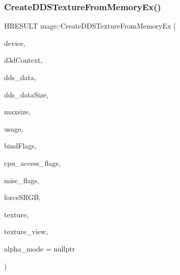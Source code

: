\subsubsection{\texorpdfstring{Create\+D\+D\+S\+Texture\+From\+Memory\+Ex()}{CreateDDSTextureFromMemoryEx()}\hspace{0.1cm}{\footnotesize\ttfamily [2/4]}}
{\footnotesize\ttfamily H\+R\+E\+S\+U\+LT mage\+::\+Create\+D\+D\+S\+Texture\+From\+Memory\+Ex (\begin{DoxyParamCaption}\item[{\+\_\+\+In\+\_\+ \hyperlink{namespacemage_ae74f374780900893caa5555d1031fd79}{Com\+Ptr}$<$ I\+D3\+D11\+Device2 $>$}]{device,  }\item[{\+\_\+\+In\+\_\+opt\+\_\+ I\+D3\+D11\+Device\+Context $\ast$}]{d3d\+Context,  }\item[{\+\_\+\+In\+\_\+reads\+\_\+bytes\+\_\+(dds\+\_\+data\+Size) const uint8\+\_\+t $\ast$}]{dds\+\_\+data,  }\item[{\+\_\+\+In\+\_\+ size\+\_\+t}]{dds\+\_\+data\+Size,  }\item[{\+\_\+\+In\+\_\+ size\+\_\+t}]{maxsize,  }\item[{\+\_\+\+In\+\_\+ D3\+D11\+\_\+\+U\+S\+A\+GE}]{usage,  }\item[{\+\_\+\+In\+\_\+ uint32\+\_\+t}]{bind\+Flags,  }\item[{\+\_\+\+In\+\_\+ uint32\+\_\+t}]{cpu\+\_\+access\+\_\+flags,  }\item[{\+\_\+\+In\+\_\+ uint32\+\_\+t}]{misc\+\_\+flags,  }\item[{\+\_\+\+In\+\_\+ bool}]{force\+S\+R\+GB,  }\item[{\+\_\+\+Outptr\+\_\+opt\+\_\+ I\+D3\+D11\+Resource $\ast$$\ast$}]{texture,  }\item[{\+\_\+\+Outptr\+\_\+opt\+\_\+ I\+D3\+D11\+Shader\+Resource\+View $\ast$$\ast$}]{texture\+\_\+view,  }\item[{\+\_\+\+Out\+\_\+opt\+\_\+ \hyperlink{namespacemage_a0c586a2bad862f4858900ca121ca80c2}{D\+D\+S\+\_\+\+A\+L\+P\+H\+A\+\_\+\+M\+O\+DE} $\ast$}]{alpha\+\_\+mode = {\ttfamily nullptr} }\end{DoxyParamCaption})}

\hypertarget{namespacemage_ace206f81b719a0a44e69aa712ebce381}{}\label{namespacemage_ace206f81b719a0a44e69aa712ebce381} 

